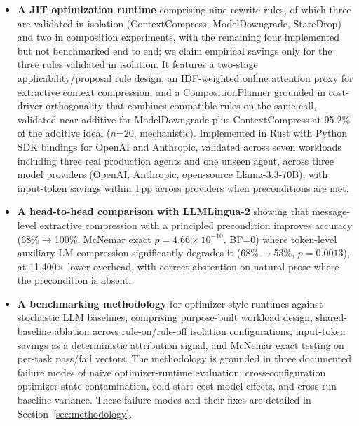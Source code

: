 \begin{itemize}
\item \textbf{A JIT optimization runtime} comprising nine rewrite rules, of which
three are validated in isolation (ContextCompress, ModelDowngrade, StateDrop) and two
in composition experiments, with the remaining four implemented but not benchmarked
end to end; we claim empirical savings only for the three rules validated in isolation.
It features a two-stage
applicability/proposal rule design, an IDF-weighted online attention proxy for
extractive context compression, and a CompositionPlanner grounded in cost-driver
orthogonality that combines compatible rules on the same call, validated near-additive
for ModelDowngrade plus ContextCompress at 95.2\% of the additive ideal ($n$=20,
mechanistic). Implemented in Rust with Python SDK bindings for OpenAI and Anthropic,
validated across seven workloads including three real production agents and one unseen
agent, across three model providers (OpenAI, Anthropic, open-source Llama-3.3-70B),
with input-token savings within 1\,pp across providers when preconditions are met.

\item \textbf{A head-to-head comparison with LLMLingua-2} showing that message-level
extractive compression with a principled precondition improves accuracy
(68\%$\rightarrow$100\%, McNemar exact $p=4.66\times10^{-10}$, BF=0) where
token-level auxiliary-LM compression significantly degrades it
(68\%$\rightarrow$53\%, $p=0.0013$), at 11{,}400$\times$ lower overhead, with
correct abstention on natural prose where the precondition is absent.

\item \textbf{A benchmarking methodology} for optimizer-style runtimes against
stochastic LLM baselines, comprising purpose-built workload design, shared-baseline
ablation across rule-on/rule-off isolation configurations, input-token savings as a
deterministic attribution signal, and McNemar exact testing on per-task pass/fail
vectors. The methodology is grounded in three documented failure modes of naive
optimizer-runtime evaluation: cross-configuration optimizer-state contamination,
cold-start cost model effects, and cross-run baseline variance. These failure modes
and their fixes are detailed in Section~\ref{sec:methodology}.


\end{itemize}
